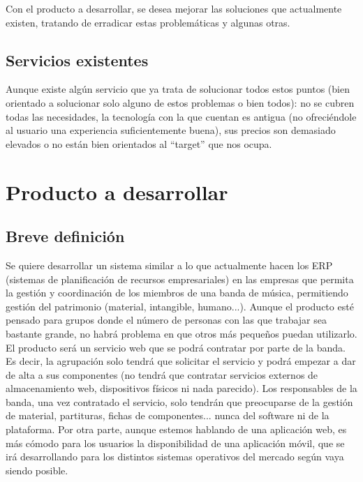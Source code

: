 \documentclass[11pt,spanish]{article}
\begin{document}
Con el producto a desarrollar, se desea mejorar las soluciones que actualmente existen,
tratando de erradicar estas problemáticas y algunas otras.

\subsection{Servicios existentes}
Aunque existe algún servicio que ya trata de solucionar todos estos puntos (bien orientado a
solucionar solo alguno de estos problemas o bien todos): no se cubren todas las necesidades,
la tecnología con la que cuentan es antigua (no ofreciéndole al usuario una experiencia suficientemente buena),
sus precios son demasiado elevados o no están bien orientados al “target” que nos ocupa.



\section{Producto a desarrollar}

\subsection{Breve definición}
Se quiere desarrollar un sistema similar a lo que actualmente hacen los ERP (sistemas de planificación de recursos empresariales)
en las empresas que permita la gestión y
coordinación de los miembros de una banda de música, permitiendo
gestión del patrimonio (material, intangible, humano...).
\newline
Aunque el producto esté pensado para grupos donde el número de personas con las
que trabajar sea bastante grande, no habrá
problema en que otros más pequeños puedan utilizarlo.
\newline
El producto será un servicio web que se podrá contratar por parte de la banda.
Es decir, la agrupación solo tendrá que solicitar el servicio y podrá empezar a dar
de alta a sus componentes (no tendrá que contratar servicios externos de almacenamiento web,
dispositivos físicos ni nada parecido). Los responsables de la banda, una vez
contratado el servicio, solo tendrán que preocuparse de la gestión de material, partituras,
fichas de componentes... nunca del software ni de la plataforma.
\newline
Por otra parte, aunque estemos hablando de una aplicación web, es más cómodo
para los usuarios la disponibilidad de una aplicación móvil, que se irá desarrollando
para los distintos sistemas operativos del mercado según vaya siendo posible.
\end{document}
